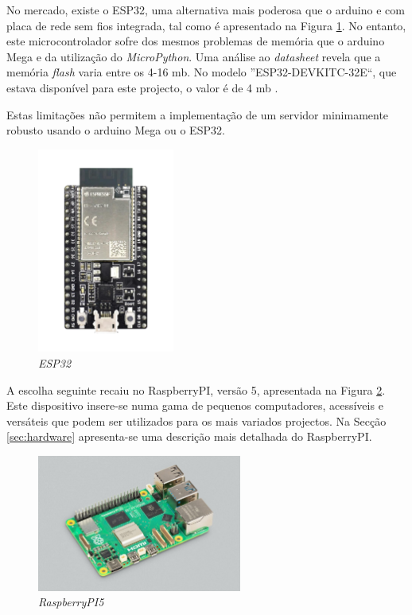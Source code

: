 No mercado, existe o \gls{ESP32}, uma alternativa mais poderosa que o \gls{arduino} e com placa de rede sem fios integrada, tal como é apresentado na Figura \ref{fig:ESP32}. No entanto, este microcontrolador sofre dos mesmos problemas de memória que o \gls{arduino} Mega e da utilização do \textit{MicroPython}. Uma análise ao \textit{datasheet} \cite{esp32datasheet} revela que a memória \textit{flash} varia entre os 4-16 \acrlong{mb}. No modelo ''ESP32-DEVKITC-32E``, que estava disponível para este projecto, o valor é de 4 \acrshort{mb} \cite{diferencaspython}.

Estas limitações não permitem a implementação de um servidor minimamente robusto usando o \gls{arduino} Mega ou o \gls{ESP32}.

\begin{figure}[hbtp]
	\centering
	\includegraphics[width=0.4\textwidth]{figures/ESP32-DevKitC_L_0.png}
	\caption{\textit{ESP32} \cite{ESPDevKit}}
	\label{fig:ESP32}
\end{figure}

A escolha seguinte recaiu no \gls{RaspberryPI}, versão 5, apresentada na Figura \ref{fig:Raspberrypi5}. Este dispositivo insere-se numa gama de pequenos computadores, acessíveis e versáteis que podem ser utilizados para os mais variados projectos. Na Secção \ref{sec:hardware} apresenta-se uma descrição mais detalhada do \gls{RaspberryPI}.

\begin{figure}[hbtp]
	\centering
	\includegraphics[width=0.6\textwidth]{figures/raspberrypi5.jpg}
	\caption{\textit{RaspberryPI5} \cite{introRaspberrypi5}}
	\label{fig:Raspberrypi5}
\end{figure}

